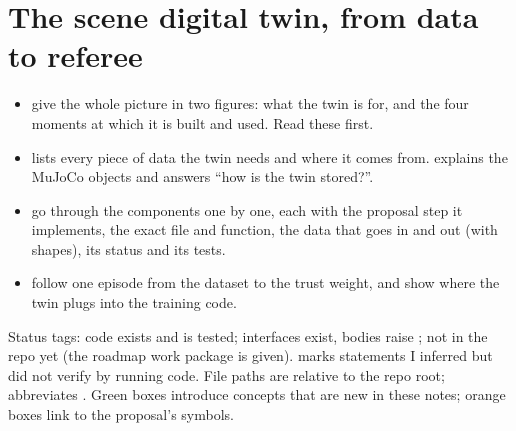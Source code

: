\chapter{The scene digital twin, from data to referee}\label{ch:twin}
\begin{keybox}[title={\textbf{How to read this document}},fonttitle=\color{white}\bfseries,colbacktitle=blue!60!black]
\begin{itemize}[leftmargin=1.2em]
\item {} give the whole picture in two figures: what the twin is for, and the four moments at which it is built and used. Read these first.
\item {} lists every piece of data the twin needs and where it comes from.  explains the MuJoCo objects and answers ``how is the twin stored?''.
\item {} go through the components one by one, each with the proposal step it implements, the exact file and function, the data that goes in and out (with shapes), its status and its tests.
\item {} follow one episode from the dataset to the trust weight, and show where the twin plugs into the training code.
\end{itemize}
Status tags: \done{} code exists and is tested; \skel{} interfaces exist, bodies raise ; \planned{} not in the repo yet (the roadmap work package is given). \chk{} marks statements I inferred but did not verify by running code. File paths are relative to the repo root;  abbreviates . Green boxes introduce concepts that are new in these notes; orange boxes link to the proposal's symbols.
\end{keybox}

